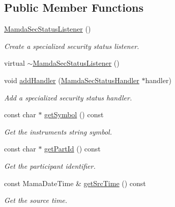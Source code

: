 \subsection*{Public Member Functions}
\begin{CompactItemize}
\item 
\hyperlink{classWombat_1_1MamdaSecStatusListener_ebc08dcac4713afaa5408a6d01913067}{Mamda\-Sec\-Status\-Listener} ()
\begin{CompactList}\small\item\em Create a specialized security status listener. \item\end{CompactList}\item 
virtual \hyperlink{classWombat_1_1MamdaSecStatusListener_58a353942b317d2b3a0cc1d69afcc815}{$\sim$Mamda\-Sec\-Status\-Listener} ()
\item 
void \hyperlink{classWombat_1_1MamdaSecStatusListener_fbf8cac77c1dbdc8da4173df05dc5b4c}{add\-Handler} (\hyperlink{classWombat_1_1MamdaSecStatusHandler}{Mamda\-Sec\-Status\-Handler} $\ast$handler)
\begin{CompactList}\small\item\em Add a specialized security status handler. \item\end{CompactList}\item 
const char $\ast$ \hyperlink{classWombat_1_1MamdaSecStatusListener_763d9b2fb391bc22abfe9223dd17bb8e}{get\-Symbol} () const 
\begin{CompactList}\small\item\em Get the instruments string symbol. \item\end{CompactList}\item 
const char $\ast$ \hyperlink{classWombat_1_1MamdaSecStatusListener_26936960eb39c5972eff2a4da4036fd3}{get\-Part\-Id} () const 
\begin{CompactList}\small\item\em Get the participant identifier. \item\end{CompactList}\item 
const Mama\-Date\-Time \& \hyperlink{classWombat_1_1MamdaSecStatusListener_75adf29cbb39a3060b593f6bb43a7d42}{get\-Src\-Time} () const 
\begin{CompactList}\small\item\em Get the source time. \item\end{CompactList}\item 

\end{CompactItemize}

